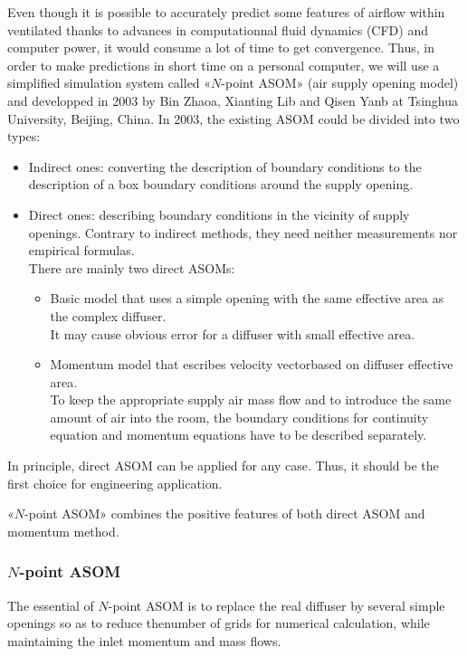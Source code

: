 \documentclass[a4paper,10pt]{article}
\begin{document}
Even though it is possible to accurately predict some features of airflow within ventilated thanks to advances in computationnal fluid dynamics (CFD) and computer power, it would consume a lot of time to get convergence.
Thus, in order to make predictions in short time on a personal computer, we will use a simplified simulation system called «$N$-point ASOM» (air supply opening model) and developped in 2003 by Bin Zhaoa, Xianting Lib and Qisen Yanb at Tsinghua University, Beijing, China.
In 2003, the existing ASOM could be divided into two types:
\begin{itemize}
    \item Indirect ones: converting the description of boundary conditions to the description of a box boundary conditions around the supply opening.
    \item Direct ones: describing boundary conditions in the vicinity of supply openings. Contrary to indirect methods, they need neither measurements nor empirical formulas.\\
    There are mainly two direct ASOMs:
    \begin{itemize}
        \item Basic model that uses a simple opening with the same effective area as the complex diffuser.\\
        It may cause obvious error for a diffuser with small effective area.
        \item Momentum model that escribes velocity vectorbased on diffuser effective area.\\
        To keep the appropriate supply air mass flow and to introduce the same amount of air into the room, the boundary conditions for continuity equation and momentum equations have to be described separately.
    \end{itemize}
\end{itemize}

In principle, direct ASOM can be applied for any case. Thus, it should be the first choice for engineering application.

«$N$-point ASOM» combines the positive features of both direct ASOM and momentum method.

\subsubsection*{$N$-point ASOM}

The essential of $N$-point ASOM is to replace the real diffuser by several simple openings so as to reduce thenumber of grids for numerical calculation, while maintaining the inlet momentum and mass flows.
\end{document}
